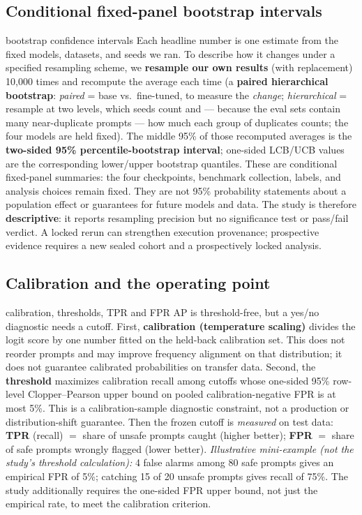 \documentclass[11pt]{article}
\begin{document}
\subsection{Conditional fixed-panel bootstrap intervals}
\label{subsec:boot}
\begin{background}{bootstrap confidence intervals}
\small
Each headline number is one estimate from the fixed models, datasets, and seeds we ran. To
describe how it changes under a specified resampling scheme, we \textbf{resample our own
results} (with replacement) 10{,}000 times and recompute the average each time (a
\textbf{paired hierarchical bootstrap}: \emph{paired} = base vs.\ fine-tuned, to measure the
\emph{change}; \emph{hierarchical} = resample at two levels, which seeds count and --- because
the eval sets contain many near-duplicate prompts --- how much each group of duplicates
counts; the four models are held fixed). The middle 95\% of those recomputed averages is the
\textbf{two-sided 95\% percentile-bootstrap interval}; one-sided LCB/UCB values are the
corresponding lower/upper bootstrap quantiles. These are conditional fixed-panel summaries:
the four checkpoints, benchmark collection, labels, and analysis choices remain fixed. They
are not 95\% probability statements about a population effect or guarantees for future models
and data. The study is therefore \textbf{descriptive}: it reports resampling precision but no
significance test or pass/fail verdict. A locked rerun can strengthen execution provenance;
prospective evidence requires a new sealed cohort and a prospectively locked analysis.
\end{background}

\subsection{Calibration and the operating point}
\label{subsec:calib}
\begin{background}{calibration, thresholds, TPR and FPR}
\small
AP is threshold-free, but a yes/no diagnostic needs a cutoff. First,
\textbf{calibration (temperature scaling)} divides the logit score by one number fitted on the
held-back calibration set. This does not reorder prompts and may improve frequency alignment
on that distribution; it does not guarantee calibrated probabilities on transfer data. Second,
the \textbf{threshold} maximizes calibration recall among cutoffs whose one-sided 95\%
row-level Clopper--Pearson upper bound on pooled calibration-negative FPR is at most 5\%. This is a
calibration-sample diagnostic constraint, not a production or distribution-shift guarantee.
Then the frozen cutoff is \emph{measured} on test data: \textbf{TPR} (recall) $=$ share of
unsafe prompts caught (higher better); \textbf{FPR} $=$ share of safe prompts wrongly flagged
(lower better). \emph{Illustrative mini-example (not the study's threshold calculation):}
4 false alarms among 80 safe prompts gives an empirical FPR of 5\%; catching 15 of 20 unsafe
prompts gives recall of 75\%. The study additionally requires the one-sided FPR upper bound,
not just the empirical rate, to meet the calibration criterion.
\end{background}
\end{document}
